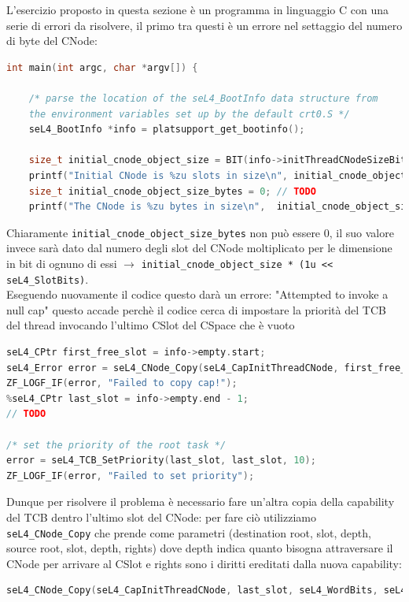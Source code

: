 L'esercizio proposto in questa sezione è un programma in linguaggio C con una serie di errori da risolvere, il primo tra questi è un errore nel settaggio del numero di byte del CNode:
\begin{lstlisting}[language=C++]
int main(int argc, char *argv[]) {

    /* parse the location of the seL4_BootInfo data structure from
    the environment variables set up by the default crt0.S */
    seL4_BootInfo *info = platsupport_get_bootinfo();

    size_t initial_cnode_object_size = BIT(info->initThreadCNodeSizeBits);
    printf("Initial CNode is %zu slots in size\n", initial_cnode_object_size);
    size_t initial_cnode_object_size_bytes = 0; // TODO
    printf("The CNode is %zu bytes in size\n", 	initial_cnode_object_size_bytes);
\end{lstlisting}
Chiaramente \texttt{initial\_cnode\_object\_size\_bytes} non può essere 0, il suo valore invece sarà dato dal numero degli slot del CNode moltiplicato per le dimensione in bit di ognuno di essi $\rightarrow$ \texttt{initial\_cnode\_object\_size * (1u << seL4\_SlotBits)}.\\
Eseguendo nuovamente il codice questo darà un errore: "Attempted to invoke a null cap" questo accade perchè il codice cerca di impostare la priorità del TCB del thread invocando l'ultimo CSlot del CSpace che è vuoto
\begin{lstlisting}[language=C++]
seL4_CPtr first_free_slot = info->empty.start;
seL4_Error error = seL4_CNode_Copy(seL4_CapInitThreadCNode, first_free_slot, seL4_WordBits, seL4_CapInitThreadCNode, seL4_CapInitThreadTCB, seL4_WordBits, seL4_AllRights);
ZF_LOGF_IF(error, "Failed to copy cap!");
%seL4_CPtr last_slot = info->empty.end - 1;
// TODO

/* set the priority of the root task */
error = seL4_TCB_SetPriority(last_slot, last_slot, 10);
ZF_LOGF_IF(error, "Failed to set priority");
\end{lstlisting}
Dunque per risolvere il problema è necessario fare un'altra copia della capability del TCB dentro l'ultimo slot del CNode: per fare ciò utilizziamo \texttt{seL4\_CNode\_Copy} che prende come parametri (destination root, slot, depth, source root, slot, depth, rights) dove depth indica quanto bisogna attraversare il CNode per arrivare al CSlot e rights sono i diritti ereditati dalla nuova capability:
\begin{lstlisting}[language=C++]
seL4_CNode_Copy(seL4_CapInitThreadCNode, last_slot, seL4_WordBits, seL4_CapInitThreadCNode, first_free_slot, seL4_WordBits, seL4_AllRights);
\end{lstlisting}
